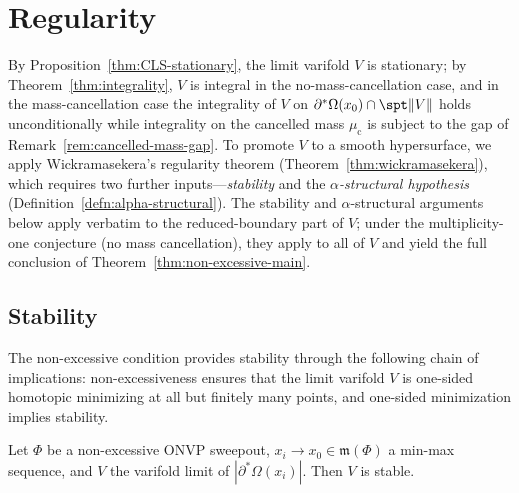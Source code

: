 
\section{Regularity}\label{sec:regularity}

By Proposition~\ref{thm:CLS-stationary}, the limit varifold $V$ is stationary; by Theorem~\ref{thm:integrality}, $V$ is integral in the no-mass-cancellation case, and in the mass-cancellation case the integrality of $V$ on $\partial^*\Omega(x_0) \cap \spt\|V\|$ holds unconditionally while integrality on the cancelled mass $\mu_{\mathrm{c}}$ is subject to the gap of Remark~\ref{rem:cancelled-mass-gap}. To promote $V$ to a smooth hypersurface, we apply Wickramasekera's regularity theorem (Theorem~\ref{thm:wickramasekera}), which requires two further inputs---\emph{stability} and the \emph{$\alpha$-structural hypothesis} (Definition~\ref{defn:alpha-structural}). The stability and $\alpha$-structural arguments below apply verbatim to the reduced-boundary part of $V$; under the multiplicity-one conjecture (no mass cancellation), they apply to all of $V$ and yield the full conclusion of Theorem~\ref{thm:non-excessive-main}.

\subsection{Stability}\label{subsec:stability}

The non-excessive condition provides stability through the following chain of implications: non-excessiveness ensures that the limit varifold $V$ is one-sided homotopic minimizing at all but finitely many points, and one-sided minimization implies stability.

\begin{proposition}\label{prop:stability}
Let $\Phi$ be a non-excessive ONVP sweepout, $x_i \to x_0 \in \mathfrak{m}(\Phi)$ a min-max sequence, and $V$ the varifold limit of $|\partial^*\Omega(x_i)|$. Then $V$ is stable.
\end{proposition}

